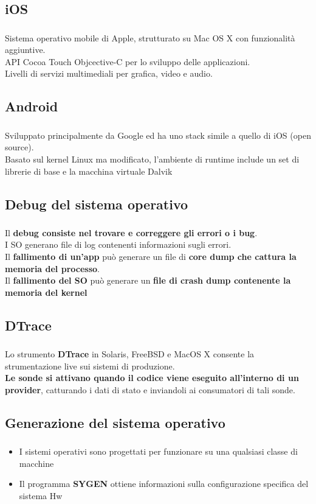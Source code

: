 \documentclass{beamer}
\newenvironment{mainframe}{
	\begin{frame}
		\frametitle{\insertsubsection}
		\framesubtitle{\insertsection}
	}{
	\end{frame}
}
\begin{document}
\subsection{iOS}
\begin{mainframe}
	Sistema operativo mobile di Apple, strutturato su Mac OS X con funzionalità aggiuntive.\\
	API Cocoa Touch Objcective-C per lo sviluppo delle applicazioni.\\
	Livelli di servizi multimediali per grafica, video e audio.
\end{mainframe}
\subsection{Android}
\begin{mainframe}
	Sviluppato principalmente da Google ed ha uno stack simile a quello di iOS (open source).\\
	Basato sul kernel Linux ma modificato, l'ambiente di runtime include un set di librerie di base e la macchina virtuale Dalvik
\end{mainframe}
\subsection{Debug del sistema operativo}
\begin{mainframe}
	Il \textbf{debug  consiste nel trovare e correggere gli errori o i bug}.\\
	I SO generano file di log contenenti informazioni sugli errori.\\
	Il \textbf{fallimento di un'app} può generare un file di \textbf{core dump che cattura la memoria del processo}.\\
	Il \textbf{fallimento del SO} può generare un \textbf{file di crash dump contenente la memoria del kernel}
\end{mainframe}
\subsection{DTrace}
\begin{mainframe}
	Lo strumento \textbf{DTrace} in Solaris, FreeBSD e MacOS X consente la strumentazione live sui sistemi di produzione.\\
	\textbf{Le sonde si attivano quando il codice viene eseguito all'interno di un provider}, catturando i dati di stato e inviandoli ai consumatori di tali sonde.
\end{mainframe}
\subsection{Generazione del sistema operativo}
\begin{mainframe}
	\begin{itemize}
		\item I sistemi operativi sono progettati per funzionare su una qualsiasi classe di macchine
		\item Il programma \textbf{SYGEN} ottiene informazioni sulla configurazione specifica del sistema Hw
	\end{itemize}
\end{mainframe}
\end{document}
